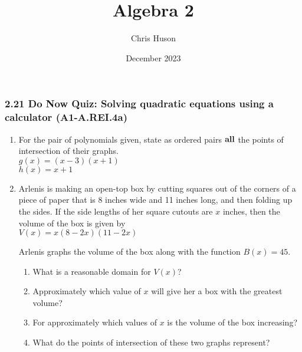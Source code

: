 \documentclass[12pt, twoside]{article}
\title{Algebra 2}
\author{Chris Huson}
\date{December 2023}
\begin{document}
\subsubsection*{2.21 Do Now Quiz: Solving quadratic equations using a calculator (A1-A.REI.4a)}
\begin{enumerate}

\item For the pair of polynomials given, state as ordered pairs $\bf{all}$ the points of intersection of their graphs. \\[0.25cm]
$g(x)=(x-3)(x+1)$ \\
$h(x)=x+1$ \vspace{3cm}

\item Arlenis is making an open-top box by cutting squares out of the corners of a piece of paper that is 8 inches wide and 11 inches long, and then folding up the sides. If the side lengths of her square cutouts are $x$ inches, then the volume of the box is given by \\[0.25cm]
$V(x)=x(8-2x)(11-2x)$

Arlenis graphs the volume of the box along with the function $B(x)=45$. 
    \begin{center}
    \end{center}
    \begin{enumerate}[itemsep=0.75cm]
        \item What is a reasonable domain for $V(x)$?
        \item Approximately which value of $x$ will give her a box with the greatest volume?
        \item For approximately which values of $x$ is the volume of the box increasing?
        \item What do the points of intersection of these two graphs represent?
    \end{enumerate}

\end{enumerate}
\end{document}
